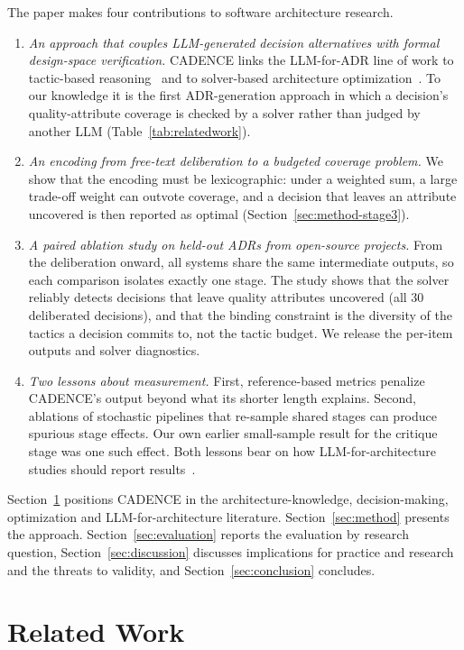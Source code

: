 \documentclass[preprint,12pt,authoryear]{elsarticle}
\renewcommand{\_}{\textunderscore\allowbreak{}}
\begin{document}
The paper makes four contributions to software architecture research.
\begin{enumerate}[leftmargin=*]
\item \emph{An approach that couples LLM-generated decision alternatives with formal design-space verification.} CADENCE links the LLM-for-ADR line of work to tactic-based reasoning~\citep{bachmann2003,bass2021saip} and to solver-based architecture optimization~\citep{aleti2013}. To our knowledge it is the first ADR-generation approach in which a decision's quality-attribute coverage is checked by a solver rather than judged by another LLM (Table~\ref{tab:relatedwork}).
\item \emph{An encoding from free-text deliberation to a budgeted coverage problem.} We show that the encoding must be lexicographic: under a weighted sum, a large trade-off weight can outvote coverage, and a decision that leaves an attribute uncovered is then reported as optimal (Section~\ref{sec:method-stage3}).
\item \emph{A paired ablation study on held-out ADRs from open-source projects.} From the deliberation onward, all systems share the same intermediate outputs, so each comparison isolates exactly one stage. The study shows that the solver reliably detects decisions that leave quality attributes uncovered (all 30 deliberated decisions), and that the binding constraint is the diversity of the tactics a decision commits to, not the tactic budget. We release the per-item outputs and solver diagnostics.
\item \emph{Two lessons about measurement.} First, reference-based metrics penalize CADENCE's output beyond what its shorter length explains. Second, ablations of stochastic pipelines that re-sample shared stages can produce spurious stage effects. Our own earlier small-sample result for the critique stage was one such effect. Both lessons bear on how LLM-for-architecture studies should report results~\citep{evtikhiev2023,roy2021}.
\end{enumerate}

Section~\ref{sec:related} positions CADENCE in the architecture-knowledge, decision-making, optimization and LLM-for-architecture literature. Section~\ref{sec:method} presents the approach. Section~\ref{sec:evaluation} reports the evaluation by research question, Section~\ref{sec:discussion} discusses implications for practice and research and the threats to validity, and Section~\ref{sec:conclusion} concludes.

\section{Related Work}
\label{sec:related}
\end{document}
